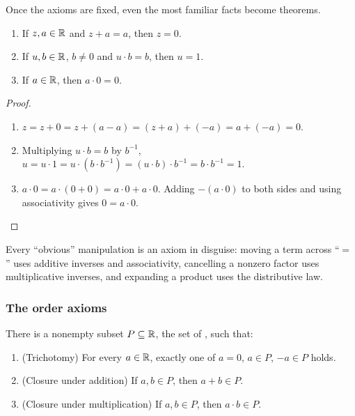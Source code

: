 Once the axioms are fixed, even the most familiar facts become theorems.
\begin{thm}\leavevmode
  \begin{enumerate}[label=(\alph*)]
    \item If $z, a \in \mathbb{R}$ and $z + a = a$, then $z = 0$.
    \item If $u, b \in \mathbb{R}$, $b \neq 0$ and $u \cdot b = b$, then $u = 1$.
    \item If $a \in \mathbb{R}$, then $a \cdot 0 = 0$.
  \end{enumerate}
\end{thm}

\begin{proof}\leavevmode
  \begin{enumerate}[label=(\alph*)]
    \item $z = z + 0 = z + (a - a) = (z + a) + (-a) = a + (-a) = 0$.
    \item Multiplying $u \cdot b = b$ by $b^{-1}$,
      $u = u \cdot 1 = u \cdot (b \cdot b^{-1}) = (u \cdot b) \cdot b^{-1} = b \cdot b^{-1} = 1$.
    \item $a \cdot 0 = a \cdot (0 + 0) = a \cdot 0 + a \cdot 0$. Adding
      $-(a \cdot 0)$ to both sides and using associativity gives
      $0 = a \cdot 0$.\qedhere
  \end{enumerate}
\end{proof}

\begin{remark}
  Every ``obvious'' manipulation is an axiom in disguise: moving a term
  across ``$=$'' uses additive inverses and associativity, cancelling a
  nonzero factor uses multiplicative inverses, and expanding a product uses
  the distributive law.
\end{remark}

\subsubsection*{The order axioms}
\begin{defi}
  There is a nonempty subset $P \subseteq \mathbb{R}$, the set of , such that:
  \begin{enumerate}[label=\textbf{O\arabic*.}, leftmargin=2.5em]
    \item (Trichotomy) For every $a \in \mathbb{R}$, exactly one of $a = 0$,
      $a \in P$, $-a \in P$ holds.
    \item (Closure under addition) If $a, b \in P$, then $a + b \in P$.
    \item (Closure under multiplication) If $a, b \in P$, then $a \cdot b \in P$.
  \end{enumerate}
\end{defi}

